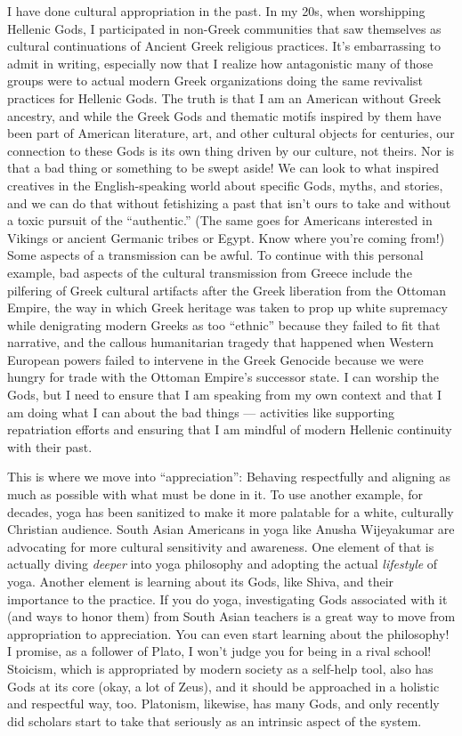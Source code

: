 \documentclass[
]{book}
\begin{document}
I have done cultural appropriation in the past. In my 20s, when worshipping Hellenic Gods, I participated in non-Greek communities that saw themselves as cultural continuations of Ancient Greek religious practices. It's embarrassing to admit in writing, especially now that I realize how antagonistic many of those groups were to actual modern Greek organizations doing the same revivalist practices for Hellenic Gods. The truth is that I am an American without Greek ancestry, and while the Greek Gods and thematic motifs inspired by them have been part of American literature, art, and other cultural objects for centuries, our connection to these Gods is its own thing driven by our culture, not theirs. Nor is that a bad thing or something to be swept aside! We can look to what inspired creatives in the English-speaking world about specific Gods, myths, and stories, and we can do that without fetishizing a past that isn't ours to take and without a toxic pursuit of the ``authentic.'' (The same goes for Americans interested in Vikings or ancient Germanic tribes or Egypt. Know where you're coming from!) Some aspects of a transmission can be awful. To continue with this personal example, bad aspects of the cultural transmission from Greece include the pilfering of Greek cultural artifacts after the Greek liberation from the Ottoman Empire, the way in which Greek heritage was taken to prop up white supremacy while denigrating modern Greeks as too ``ethnic'' because they failed to fit that narrative, and the callous humanitarian tragedy that happened when Western European powers failed to intervene in the Greek Genocide because we were hungry for trade with the Ottoman Empire's successor state. I can worship the Gods, but I need to ensure that I am speaking from my own context and that I am doing what I can about the bad things --- activities like supporting repatriation efforts and ensuring that I am mindful of modern Hellenic continuity with their past.

This is where we move into ``appreciation'': Behaving respectfully and aligning as much as possible with what must be done in it. To use another example, for decades, yoga has been sanitized to make it more palatable for a white, culturally Christian audience. South Asian Americans in yoga like Anusha Wijeyakumar are advocating for more cultural sensitivity and awareness. One element of that is actually diving \emph{deeper} into yoga philosophy and adopting the actual \emph{lifestyle} of yoga. Another element is learning about its Gods, like Shiva, and their importance to the practice. If you do yoga, investigating Gods associated with it (and ways to honor them) from South Asian teachers is a great way to move from appropriation to appreciation. You can even start learning about the philosophy! I promise, as a follower of Plato, I won't judge you for being in a rival school! Stoicism, which is appropriated by modern society as a self-help tool, also has Gods at its core (okay, a lot of Zeus), and it should be approached in a holistic and respectful way, too. Platonism, likewise, has many Gods, and only recently did scholars start to take that seriously as an intrinsic aspect of the system.
\end{document}
